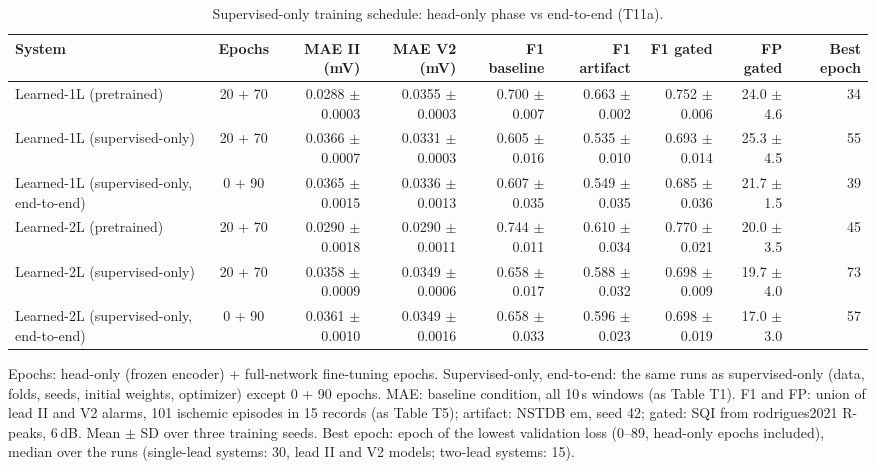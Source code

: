 \begin{table}[htbp]
\centering
\small
\caption{Supervised-only training schedule: head-only phase vs end-to-end (T11a).}
\label{tab:t11a_schedule}
\begin{tabular}{lcrrrrrrr}
\toprule
System & Epochs & MAE II (mV) & MAE V2 (mV) & F1 baseline & F1 artifact & F1 gated & FP gated & Best epoch \\
\midrule
Learned-1L (pretrained) & 20 + 70 & 0.0288 $\pm$ 0.0003 & 0.0355 $\pm$ 0.0003 & 0.700 $\pm$ 0.007 & 0.663 $\pm$ 0.002 & 0.752 $\pm$ 0.006 & 24.0 $\pm$ 4.6 & 34 \\
Learned-1L (supervised-only) & 20 + 70 & 0.0366 $\pm$ 0.0007 & 0.0331 $\pm$ 0.0003 & 0.605 $\pm$ 0.016 & 0.535 $\pm$ 0.010 & 0.693 $\pm$ 0.014 & 25.3 $\pm$ 4.5 & 55 \\
Learned-1L (supervised-only, end-to-end) & 0 + 90 & 0.0365 $\pm$ 0.0015 & 0.0336 $\pm$ 0.0013 & 0.607 $\pm$ 0.035 & 0.549 $\pm$ 0.035 & 0.685 $\pm$ 0.036 & 21.7 $\pm$ 1.5 & 39 \\
\midrule
Learned-2L (pretrained) & 20 + 70 & 0.0290 $\pm$ 0.0018 & 0.0290 $\pm$ 0.0011 & 0.744 $\pm$ 0.011 & 0.610 $\pm$ 0.034 & 0.770 $\pm$ 0.021 & 20.0 $\pm$ 3.5 & 45 \\
Learned-2L (supervised-only) & 20 + 70 & 0.0358 $\pm$ 0.0009 & 0.0349 $\pm$ 0.0006 & 0.658 $\pm$ 0.017 & 0.588 $\pm$ 0.032 & 0.698 $\pm$ 0.009 & 19.7 $\pm$ 4.0 & 73 \\
Learned-2L (supervised-only, end-to-end) & 0 + 90 & 0.0361 $\pm$ 0.0010 & 0.0349 $\pm$ 0.0016 & 0.658 $\pm$ 0.033 & 0.596 $\pm$ 0.023 & 0.698 $\pm$ 0.019 & 17.0 $\pm$ 3.0 & 57 \\
\bottomrule
\end{tabular}

\par\smallskip\footnotesize Epochs: head-only (frozen encoder) + full-network fine-tuning epochs. Supervised-only, end-to-end: the same runs as supervised-only (data, folds, seeds, initial weights, optimizer) except 0 + 90 epochs. MAE: baseline condition, all 10\,s windows (as Table T1). F1 and FP: union of lead II and V2 alarms, 101 ischemic episodes in 15 records (as Table T5); artifact: NSTDB em, seed 42; gated: SQI from rodrigues2021 R-peaks, 6\,dB. Mean $\pm$ SD over three training seeds. Best epoch: epoch of the lowest validation loss (0--89, head-only epochs included), median over the runs (single-lead systems: 30, lead II and V2 models; two-lead systems: 15).
\end{table}
